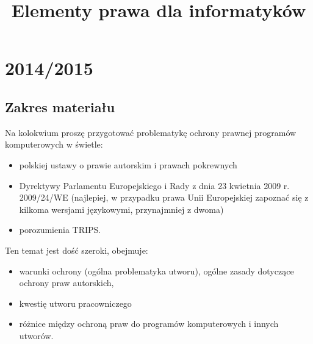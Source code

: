 \documentclass[12pt,a4paper]{article}
\title{Elementy prawa dla informatyków}
\author{}
\date{\vspace{-10ex}}
\begin{document}
\maketitle

\section{2014/2015}
\subsection{Zakres materiału}
Na kolokwium proszę przygotować problematykę ochrony prawnej programów komputerowych w świetle:
\begin{itemize}
\item polskiej ustawy o prawie autorskim i prawach pokrewnych
\item  Dyrektywy Parlamentu Europejskiego i Rady z dnia 23 kwietnia 2009 r. 2009/24/WE (najlepiej, w przypadku prawa Unii Europejskiej zapoznać się z kilkoma wersjami językowymi, przynajmniej z dwoma)
\item porozumienia TRIPS.
\end{itemize}
Ten temat jest dość szeroki, obejmuje:
\begin{itemize}
\item warunki ochrony (ogólna problematyka utworu), ogólne zasady dotyczące ochrony praw autorskich,
\item kwestię utworu pracowniczego
\item różnice między ochroną praw do programów komputerowych i innych utworów.
\end{itemize} 
\end{document}
